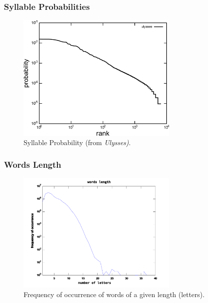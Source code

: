 \documentclass[notes]{beamer}
\begin{document}
\frame
{
  \frametitle{Syllable Probabilities}
  \begin{figure}[h!]
  \centering
  \includegraphics[width=0.7\textwidth]{imagespresentation/ulysses_syllables_probabilities.pdf}
  \caption{Syllable Probability (from \emph{Ulysses)}.}
  \label{fig:ulysses_syllables_probabilities}
  \end{figure} 
}




\frame
{
  \frametitle{Words Length}
\begin{figure}[h!]
\centering
\includegraphics[width=0.7\textwidth]{images/wordslength_en.pdf}
\caption{Frequency of occurrence of words of a given length (letters).}
\label{fig:wordslength_en}
\end{figure}   
}


\end{document}
